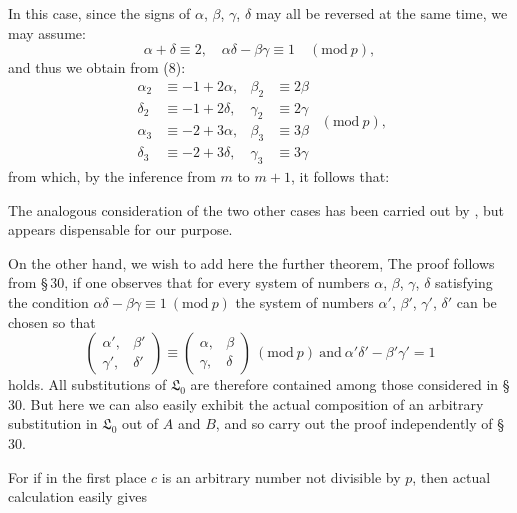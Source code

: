 
In this case, since the signs of $\alpha$, $\beta$,
$\gamma$, $\delta$ may all be reversed at the same time, we may assume:
\[
\alpha+\delta\equiv 2, \quad \alpha\delta-\beta\gamma\equiv 1 \quad (\mathrm{mod}\ p),
\]
and thus we obtain from (8):
\[
\begin{aligned}
\alpha_2 &\equiv -1+2\alpha, & \beta_2 &\equiv 2\beta\\
\delta_2 &\equiv -1+2\delta, & \gamma_2 &\equiv 2\gamma\\
\alpha_3 &\equiv -2+3\alpha, & \beta_3 &\equiv 3\beta\\
\delta_3 &\equiv -2+3\delta, & \gamma_3 &\equiv 3\gamma
\end{aligned}\ \ (\mathrm{mod}\ p),
\]
from which, by the inference from $m$ to $m+1$, it follows that:

The analogous consideration of the two other cases has been carried out by
, but appears dispensable for our purpose.

On the other hand, we wish to add here the further theorem, 
The proof follows from \S\,30, if one observes that
for every system of numbers $\alpha$, $\beta$, $\gamma$, $\delta$ satisfying the condition $\alpha\delta-\beta\gamma\equiv 1\ (\mathrm{mod}\ p)$
the system of numbers $\alpha'$, $\beta'$, $\gamma'$, $\delta'$ can be
chosen so that
\[
\begin{pmatrix}\alpha', & \beta'\\ \gamma', & \delta'\end{pmatrix} \equiv \begin{pmatrix}\alpha, & \beta\\ \gamma, & \delta\end{pmatrix}\ (\mathrm{mod}\ p) \ \text{and}\ \alpha'\delta'-\beta'\gamma'=1
\]
holds. All substitutions of $\mathfrak{L}_0$ are therefore contained among those considered in \S\,30.
But here we can also easily exhibit the actual
composition of an arbitrary substitution in $\mathfrak{L}_0$ out of $A$ and
$B$, and so carry out the proof independently of \S\,30.

For if in the first place $c$ is an arbitrary number not divisible by $p$,
then actual calculation easily gives
